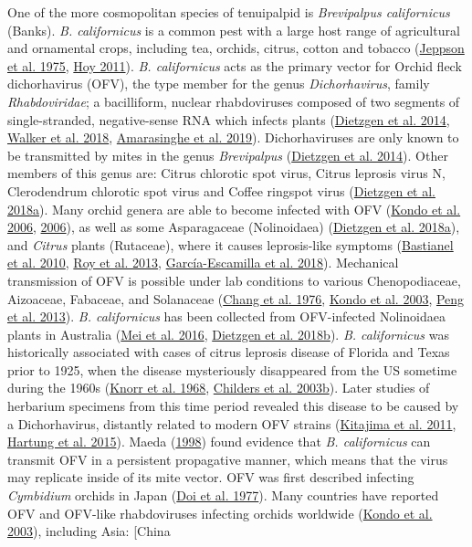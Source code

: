 \documentclass{ufdissertation}[overrideChapters] %
\begin{document}
{One of the more cosmopolitan species of tenuipalpid is \emph{Brevipalpus californicus} (Banks). \emph{B. californicus} is a common pest with a large host range of agricultural and ornamental crops, including tea, orchids, citrus, cotton and tobacco (\protect\hyperlink{ref-Jeppson1975}{Jeppson et al. 1975}, \protect\hyperlink{ref-Hoy2011}{Hoy 2011}). \emph{B. californicus} acts as the primary vector for Orchid fleck dichorhavirus (OFV), the type member for the genus \emph{Dichorhavirus}, family \emph{Rhabdoviridae}; a bacilliform, nuclear rhabdoviruses composed of two segments of single-stranded, negative-sense RNA which infects plants (\protect\hyperlink{ref-Dietzgen2014}{Dietzgen et al. 2014}, \protect\hyperlink{ref-Walker2018}{Walker et al. 2018}, \protect\hyperlink{ref-Amarasinghe2019}{Amarasinghe et al. 2019}). Dichorhaviruses are only known to be transmitted by mites in the genus \emph{Brevipalpus} (\protect\hyperlink{ref-Dietzgen2014}{Dietzgen et al. 2014}). Other members of this genus are: Citrus chlorotic spot virus, Citrus leprosis virus N, Clerodendrum chlorotic spot virus and Coffee ringspot virus (\protect\hyperlink{ref-Dietzgen2018}{Dietzgen et al. 2018a}). Many orchid genera are able to become infected with OFV (\protect\hyperlink{ref-Kondo2006}{Kondo et al. 2006}, \protect\hyperlink{ref-Kondo2006}{2006}), as well as some Asparagaceae (Nolinoidaea) (\protect\hyperlink{ref-Dietzgen2018}{Dietzgen et al. 2018a}), and \emph{Citrus} plants (Rutaceae), where it causes leprosis-like symptoms (\protect\hyperlink{ref-Bastianel2010}{Bastianel et al. 2010}, \protect\hyperlink{ref-Roy2013a}{Roy et al. 2013}, \protect\hyperlink{ref-GarciaEscamilla2018}{García-Escamilla et al. 2018}). Mechanical transmission of OFV is possible under lab conditions to various Chenopodiaceae, Aizoaceae, Fabaceae, and Solanaceae (\protect\hyperlink{ref-Chang1976}{Chang et al. 1976}, \protect\hyperlink{ref-Kondo2003}{Kondo et al. 2003}, \protect\hyperlink{ref-Peng2013}{Peng et al. 2013}). \emph{B. californicus} has been collected from OFV-infected Nolinoidaea plants in Australia (\protect\hyperlink{ref-Mei2016}{Mei et al. 2016}, \protect\hyperlink{ref-Dietzgen2018a}{Dietzgen et al. 2018b}). \emph{B. californicus} was historically associated with cases of citrus leprosis disease of Florida and Texas prior to 1925, when the disease mysteriously disappeared from the US sometime during the 1960s (\protect\hyperlink{ref-Knorr1968b}{Knorr et al. 1968}, \protect\hyperlink{ref-Childers2003}{Childers et al. 2003b}). Later studies of herbarium specimens from this time period revealed this disease to be caused by a Dichorhavirus, distantly related to modern OFV strains (\protect\hyperlink{ref-Kitajima2011a}{Kitajima et al. 2011}, \protect\hyperlink{ref-Hartung2015}{Hartung et al. 2015}). Maeda (\protect\hyperlink{ref-Maeda1998}{1998}) found evidence that \emph{B. californicus} can transmit OFV in a persistent propagative manner, which means that the virus may replicate inside of its mite vector. OFV was first described infecting \emph{Cymbidium} orchids in Japan (\protect\hyperlink{ref-Doi1977}{Doi et al. 1977}). Many countries have reported OFV and OFV-like rhabdoviruses infecting orchids worldwide (\protect\hyperlink{ref-Kondo2003}{Kondo et al. 2003}), including Asia: {[}China }
\end{document}
